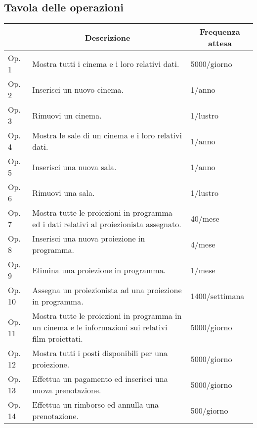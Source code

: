 \subsection*{Tavola delle operazioni}
%
%
\begin{tabularx}{\linewidth}{|l|X|X|}
    \hline
    \rowcolor{tblhdrcolor}
    \multicolumn{1}{|c|}{\textbf{Cod.}}
     & \multicolumn{1}{|c|}{\textbf{Descrizione}}
     & \multicolumn{1}{|c|}{\textbf{Frequenza attesa}}
    \\ \hline
    Op. 1
     & Mostra tutti i cinema e i loro relativi dati.
     & 5000/giorno
    \\ \hline
    Op. 2
     & Inserisci un nuovo cinema.
     & 1/anno
    \\ \hline
    Op. 3
     & Rimuovi un cinema.
     & 1/lustro
    \\ \hline
    Op. 4
     & Mostra le sale di un cinema e i loro relativi dati.
     & 1/anno
    \\ \hline
    Op. 5
     & Inserisci una nuova sala.
     & 1/anno
    \\ \hline
    Op. 6
     & Rimuovi una sala.
     & 1/lustro
    \\ \hline
    Op. 7
     & Mostra tutte le proiezioni in programma ed i dati relativi al
    proiezionista assegnato.
     & 40/mese
    \\ \hline
    Op. 8
     & Inserisci una nuova proiezione in programma.
     & 4/mese
    \\ \hline
    Op. 9
     & Elimina una proiezione in programma.
     & 1/mese
    \\ \hline
    Op. 10
     & Assegna un proiezionista ad una proiezione in programma.
     & 1400/settimana
    \\ \hline
    Op. 11
     & Mostra tutte le proiezioni in programma in un cinema e le informazioni
    sui relativi film proiettati.
     & 5000/giorno
    \\ \hline
    Op. 12
     & Mostra tutti i posti disponibili per una proiezione.
     & 5000/giorno
    \\ \hline
    Op. 13
     & Effettua un pagamento ed inserisci una nuova prenotazione.
     & 5000/giorno
    \\ \hline
    Op. 14
     & Effettua un rimborso ed annulla una prenotazione.
     & 500/giorno

\end{tabularx}

